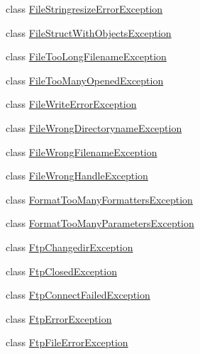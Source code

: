 \begin{DoxyCompactItemize}
\item 
class \hyperlink{class_m_q_l4_c_sharp_1_1_base_1_1_exceptions_1_1_file_stringresize_error_exception}{File\+Stringresize\+Error\+Exception}
\item 
class \hyperlink{class_m_q_l4_c_sharp_1_1_base_1_1_exceptions_1_1_file_struct_with_objects_exception}{File\+Struct\+With\+Objects\+Exception}
\item 
class \hyperlink{class_m_q_l4_c_sharp_1_1_base_1_1_exceptions_1_1_file_too_long_filename_exception}{File\+Too\+Long\+Filename\+Exception}
\item 
class \hyperlink{class_m_q_l4_c_sharp_1_1_base_1_1_exceptions_1_1_file_too_many_opened_exception}{File\+Too\+Many\+Opened\+Exception}
\item 
class \hyperlink{class_m_q_l4_c_sharp_1_1_base_1_1_exceptions_1_1_file_write_error_exception}{File\+Write\+Error\+Exception}
\item 
class \hyperlink{class_m_q_l4_c_sharp_1_1_base_1_1_exceptions_1_1_file_wrong_directoryname_exception}{File\+Wrong\+Directoryname\+Exception}
\item 
class \hyperlink{class_m_q_l4_c_sharp_1_1_base_1_1_exceptions_1_1_file_wrong_filename_exception}{File\+Wrong\+Filename\+Exception}
\item 
class \hyperlink{class_m_q_l4_c_sharp_1_1_base_1_1_exceptions_1_1_file_wrong_handle_exception}{File\+Wrong\+Handle\+Exception}
\item 
class \hyperlink{class_m_q_l4_c_sharp_1_1_base_1_1_exceptions_1_1_format_too_many_formatters_exception}{Format\+Too\+Many\+Formatters\+Exception}
\item 
class \hyperlink{class_m_q_l4_c_sharp_1_1_base_1_1_exceptions_1_1_format_too_many_parameters_exception}{Format\+Too\+Many\+Parameters\+Exception}
\item 
class \hyperlink{class_m_q_l4_c_sharp_1_1_base_1_1_exceptions_1_1_ftp_changedir_exception}{Ftp\+Changedir\+Exception}
\item 
class \hyperlink{class_m_q_l4_c_sharp_1_1_base_1_1_exceptions_1_1_ftp_closed_exception}{Ftp\+Closed\+Exception}
\item 
class \hyperlink{class_m_q_l4_c_sharp_1_1_base_1_1_exceptions_1_1_ftp_connect_failed_exception}{Ftp\+Connect\+Failed\+Exception}
\item 
class \hyperlink{class_m_q_l4_c_sharp_1_1_base_1_1_exceptions_1_1_ftp_error_exception}{Ftp\+Error\+Exception}
\item 
class \hyperlink{class_m_q_l4_c_sharp_1_1_base_1_1_exceptions_1_1_ftp_file_error_exception}{Ftp\+File\+Error\+Exception}

\end{DoxyCompactItemize}

